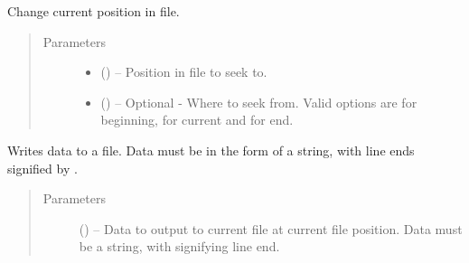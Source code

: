 \documentclass[a4paper,10pt,openany,english]{sphinxmanual}
\begin{document}
\begin{fulllineitems}
\begin{fulllineitems}
\end{fulllineitems}


\begin{fulllineitems}
\label{egadsapi:egads.input.text_file_io.EgadsFile.seek}
Change current position in file.
\begin{quote}\begin{description}
\item[{Parameters}] \leavevmode\begin{itemize}
\item {} 
 () -- Position in file to seek to.

\item {} 
 () -- Optional - Where to seek from. Valid options are  for beginning,  for
current and  for end.

\end{itemize}

\end{description}\end{quote}

\end{fulllineitems}


\begin{fulllineitems}
\label{egadsapi:egads.input.text_file_io.EgadsFile.write}
Writes data to a file. Data must be in the form of a string, with line
ends signified by .
\begin{quote}\begin{description}
\item[{Parameters}] \leavevmode
{} () -- Data to output to current file at current file position. Data must
be a string, with  signifying line end.

\end{description}\end{quote}

\end{fulllineitems}


\end{fulllineitems}
\end{document}
